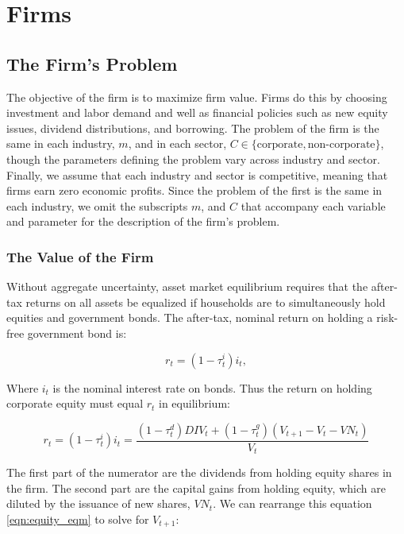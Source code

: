 \chapter{Firms}
%



\section{The Firm's Problem}

The objective of the firm is to maximize firm value.  Firms do this by choosing investment and labor demand and well as financial policies such as new equity issues, dividend distributions, and borrowing.  The problem of the firm is the same in each industry, $m$, and in each sector, $C\in\{\text{corporate},\text{non-corporate}\}$, though the parameters defining the problem vary across industry and sector.  Finally, we assume that each industry and sector is competitive, meaning that firms earn zero economic profits.  Since the problem of the first is the same in each industry, we omit the subscripts $m$, and $C$ that accompany each variable and parameter for the description of the firm's problem.

\subsection{The Value of the Firm}

Without aggregate uncertainty, asset market equilibrium requires that the after-tax returns on all assets be equalized if households are to simultaneously hold equities and government bonds.  The after-tax, nominal return on holding a risk-free government bond is:

\begin{equation}
\label{eqn:r}
r_{t}=(1-\tau^{i}_{t})i_{t},
\end{equation}

\noindent\noindent Where $i_{t}$ is the nominal interest rate on bonds.  Thus the return on holding corporate equity must equal $r_{t}$ in equilibrium:

\begin{equation}
\label{eqn:equity_eqm}
r_{t}=(1-\tau^{i}_{t})i_{t}=\frac{(1-\tau^{d}_{t})DIV_{t}+(1-\tau^{g}_{t})(V_{t+1}-V_{t}-VN_{t})}{V_{t}}
\end{equation}

The first part of the numerator are the dividends from holding equity shares in the firm.  The second part are the capital gains from holding equity, which are diluted by the issuance of new shares, $VN_{t}$.  We can rearrange this equation \ref{eqn:equity_eqm} to solve for $V_{t+1}$:

